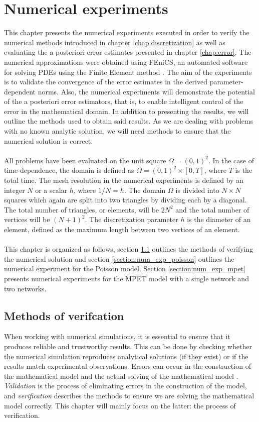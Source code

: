 \chapter{Numerical experiments}
\label{chap:experiments}
This chapter presents the numerical experiments executed in order to verify the numerical methods introduced in chapter \ref{chap:discretization} as well as evaluating the a posteriori error estimates presented in chapter \ref{chap:error}. The numerical approximations were obtained using FEniCS, an automated software for solving PDEs using the Finite Element method \cite{fenics}. The aim of the experiments is to validate the convergence of the error estimates in the derived parameter-dependent norms. Also, the numerical experiments will demonstrate the potential of the a posteriori error estimators, that is, to enable intelligent control of the error in the mathematical domain. In addition to presenting the results, we will outline the methods used to obtain said results. As we are dealing with problems with no known analytic solution, we will need methods to ensure that the numerical solution is correct. 
\\
\\
All problems have been evaluated on the unit square $\Omega = (0,1)^2$. In the case of time-dependence, the domain is defined as $\Omega = (0,1)^2 \times [0, T]$, where $T$ is the total time. The mesh resolution in the numerical experiments is defined by an integer $N$ or a scalar $h$, where  $1/N=h$. The domain $\Omega$ is divided into $N \times N$ squares which again are split into two triangles by dividing each by a diagonal. The total number of triangles, or elements, will be $2N^2$ and the total number of vertices will be $(N+1)^2$. The discretization parameter $h$ is the diameter of an element, defined as the maximum length between two vertices of an element.
\\
\\
This chapter is organized as follows, section \ref{section:verification} outlines the methods of verifying the numerical solution and section \ref{section:num_exp_poisson} outlines the numerical experiment for the Poisson model. Section \ref{section:num_exp_mpet} presents numerical experiments for the MPET model with a single network and two networks. 

\section{Methods of verifcation} \label{section:verification}
When working with numerical simulations, it is essential to ensure that it produces reliable and trustworthy results. This can be done by checking whether the numerical simulation reproduces analytical solutions (if they exist) or if the results match experimental observations. Errors can occur in the construction of the mathematical model and the actual solving of the mathematical model \cite{oberkampf}. \textit{Validation} is the process of eliminating errors in the construction of the model, and \textit{verification} describes the methods to ensure we are solving the mathematical model correctly. This chapter will mainly focus on the latter: the process of verification. 

